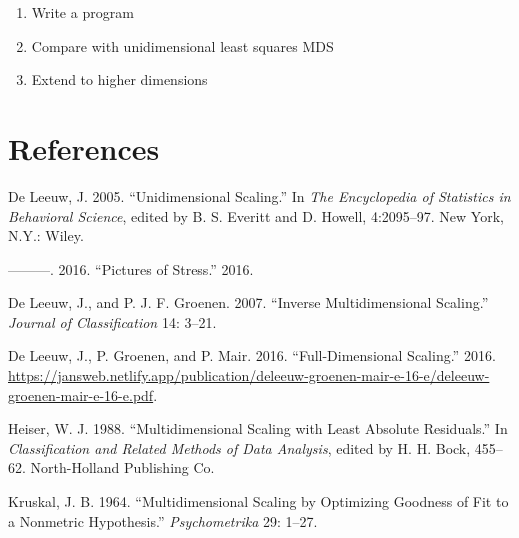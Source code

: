 \documentclass[
  12pt,
  letterpaper,
  DIV=11,
  numbers=noendperiod]{scrartcl}
\providecommand{\tightlist}{%
  \setlength{\itemsep}{0pt}\setlength{\parskip}{0pt}}\usepackage{longtable,booktabs,array}
\newlength{\cslhangindent}
\newenvironment{CSLReferences}[2] %
 {\begin{list}{}{%
  \setlength{\itemindent}{0pt}
  \setlength{\leftmargin}{0pt}
  \setlength{\parsep}{0pt}
  \ifodd #1
   \setlength{\leftmargin}{\cslhangindent}
   \setlength{\itemindent}{-1\cslhangindent}
  \fi
  \setlength{\itemsep}{#2\baselineskip}}}
 {\end{list}}
\begin{document}
\begin{enumerate}
\def\labelenumi{\arabic{enumi}.}
\tightlist
\item
  Write a program
\item
  Compare with unidimensional least squares MDS
\item
  Extend to higher dimensions
\end{enumerate}

\section*{References}\label{references}

\label{refs}
\begin{CSLReferences}{1}{0}
De Leeuw, J. 2005. {``{Unidimensional Scaling}.''} In \emph{The
Encyclopedia of Statistics in Behavioral Science}, edited by B. S.
Everitt and D. Howell, 4:2095--97. New York, N.Y.: Wiley.

---------. 2016. {``Pictures of Stress.''} 2016.

De Leeuw, J., and P. J. F. Groenen. 2007. {``Inverse Multidimensional
Scaling.''} \emph{Journal of Classification} 14: 3--21.

De Leeuw, J., P. Groenen, and P. Mair. 2016. {``Full-Dimensional
Scaling.''} 2016.
\url{https://jansweb.netlify.app/publication/deleeuw-groenen-mair-e-16-e/deleeuw-groenen-mair-e-16-e.pdf}.

Heiser, W. J. 1988. {``{Multidimensional Scaling with Least Absolute
Residuals}.''} In \emph{Classification and Related Methods of Data
Analysis}, edited by H. H. Bock, 455--62. North-Holland Publishing Co.

Kruskal, J. B. 1964. {``{Multidimensional Scaling by Optimizing Goodness
of Fit to a Nonmetric Hypothesis}.''} \emph{Psychometrika} 29: 1--27.

\end{CSLReferences}
\end{document}
